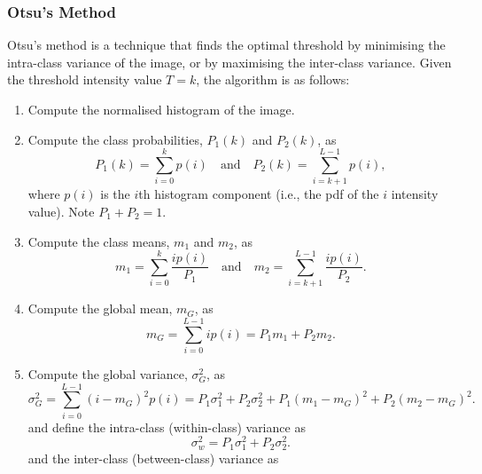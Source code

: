 \documentclass{article}
\begin{document}
\subsubsection{Otsu's Method}
Otsu's method is a technique that finds the optimal threshold by
minimising the intra-class variance of the image, or by maximising the
inter-class variance. Given the threshold intensity value \(T = k\),
the algorithm is as follows:
\begin{enumerate}
    \item Compute the normalised histogram of the image.
    \item Compute the class probabilities, \(P_1\left( k \right)\) and
          \(P_2\left( k \right)\), as
          \begin{equation*}
              P_1\left( k \right) = \sum_{i = 0}^k p\left( i \right) \quad \text{and} \quad P_2\left( k \right) = \sum_{i = k + 1}^{L - 1} p\left( i \right),
          \end{equation*}
          where \(p\left( i \right)\) is the \(i\)th histogram component
          (i.e., the pdf of the \(i\) intensity value). Note \(P_1 + P_2 = 1\).
    \item Compute the class means, \(m_1\) and \(m_2\), as
          \begin{equation*}
              m_1 = \sum_{i = 0}^k \frac{i p\left( i \right)}{P_1} \quad \text{and} \quad m_2 = \sum_{i = k + 1}^{L - 1} \frac{i p\left( i \right)}{P_2}.
          \end{equation*}
    \item Compute the global mean, \(m_G\), as
          \begin{equation*}
              m_G = \sum_{i = 0}^{L - 1} i p\left( i \right) = P_1 m_1 + P_2 m_2.
          \end{equation*}
    \item Compute the global variance, \(\sigma_G^2\), as
          \begin{equation*}
              \sigma_G^2 = \sum_{i = 0}^{L - 1} \left( i - m_G \right)^2 p\left( i \right) = P_1 \sigma_1^2 + P_2 \sigma_2^2 + P_1 \left( m_1 - m_G \right)^2 + P_2 \left( m_2 - m_G \right)^2.
          \end{equation*}
          and define the intra-class (within-class) variance as
          \begin{equation*}
              \sigma_w^2 = P_1 \sigma_1^2 + P_2 \sigma_2^2.
          \end{equation*}
          and the inter-class (between-class) variance as

\end{enumerate}
\end{document}
